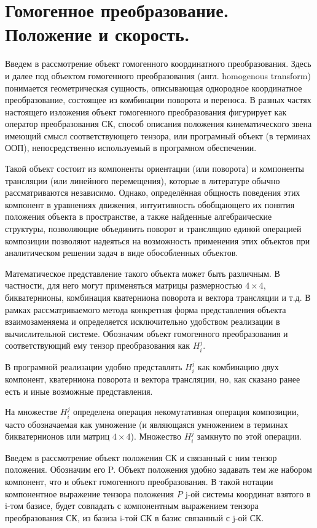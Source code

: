 \section{Гомогенное преобразование. Положение и скорость.}\label{geom}

Введем в рассмотрение объект гомогенного координатного преобразования. Здесь и далее под объектом гомогенного преобразования (англ. homogenous transform) понимается геометрическая сущность, описывающая однородное координатное преобразование, состоящее из комбинации поворота и переноса. В разных частях настоящего изложения объект гомогенного преобразования фигурирует как оператор преобразования СК, способ описания положения кинематического звена имеющий смысл соответствующего тензора, или програмный объект (в терминах ООП), непосредственно используемый в програмном обеспечении. 

Такой объект состоит из компоненты ориентации (или поворота) и компоненты трансляции (или линейного перемещения), которые в литературе обычно рассматриваются независимо. Однако, определённая общность поведения этих компонент в уравнениях движения, интуитивность обобщающего их понятия положения объекта в пространстве, а также найденные алгебраические структуры, позволяющие объединить поворот и трансляцию единой операцией композиции позволяют надеяться на возможность применения этих объектов при аналитическом решении задач в виде обособленных объектов.   

Математическое представление такого объекта может быть различным. В частности, для него могут применяться матрицы размерностью $4\times4$, бикватернионы, комбинация кватерниона поворота и вектора трансляции и т.д. В рамках рассматриваемого метода конкретная форма представления объекта взаимозаменяема и определяется исключительно удобством реализации в вычислительной системе. Обозначим объект гомогенного преобразования и соответствующий ему тензор преобразования как $H^j_i$. 

В програмной реализации удобно представлять $H^j_i$ как комбинацию двух компонент, кватерниона поворота и вектора трансляции, но, как сказано ранее есть и иные возможные представления. 

На множестве $H^j_i$ определена операция некомутативная операция композиции, часто обозначаемая как умножение (и являющаяся умножением в терминах бикватернионов или матриц $4\times4$). Множество $H^j_i$ замкнуто по этой операции.

Введем в рассмотрение объект положения СК и связанный с ним тензор положения. Обозначим его P. Объект положения удобно задавать тем же набором компонент, что и объект гомогенного преобразования. В такой нотации компонентное выражение тензора положения $P$ j-ой системы координат взятого в i-том базисе, будет совпадать с компонентным выражением тензора преобразования СК, из базиза i-той СК в базис связанный с j-ой СК. 

